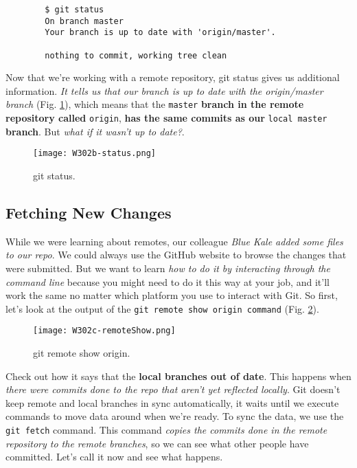 	\begin{verbatim}
		$ git status
		On branch master
		Your branch is up to date with 'origin/master'.
		
		nothing to commit, working tree clean
	\end{verbatim}
	
	Now that we're working with a remote repository, git status gives us additional information. \textit{It tells us that our branch is up to date with the origin/master branch} (Fig. \ref{W302b-status}), which means that the \texttt{master} \textbf{branch in the remote repository called} \texttt{origin}, \textbf{has the same commits as our} \texttt{local master} \textbf{branch}. But \textit{what if it wasn't up to date?}.
	
	\begin{figure} 
		\caption{git status.}
		\centering
		\texttt{[image: W302b-status.png]}
		\label{W302b-status}
	\end{figure}


	\subsection{Fetching New Changes} \label{W302c}

	While we were learning about remotes, our colleague \textit{Blue Kale added some files to our repo}. We could always use the GitHub website to browse the changes that were submitted. But we want to learn \textit{how to do it by interacting through the command line} because you might need to do it this way at your job, and it'll work the same no matter which platform you use to interact with Git. So first, let's look at the output of the \verb|git remote show origin command| (Fig. \ref{W302c-remoteShow}).
	
	\begin{figure} 
		\caption{git remote show origin.}
		\centering
		\texttt{[image: W302c-remoteShow.png]}
		\label{W302c-remoteShow}
	\end{figure}
	
	
	Check out how it says that the \textbf{local branches out of date}. This happens when\textit{ there were commits done to the repo that aren't yet reflected locally}. Git doesn't keep remote and local branches in sync automatically, it waits until we execute commands to move data around when we're ready. To sync the data, we use the \verb|git fetch| command. This command \textit{copies the commits done in the remote repository to the remote branches}, so we can see what other people have committed. Let's call it now and see what happens.
	
